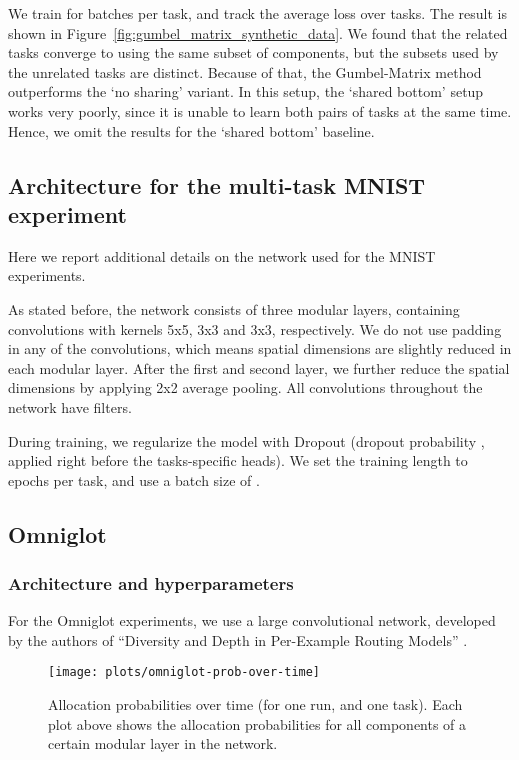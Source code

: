 \documentclass[conference]{IEEEtran}
\begin{document}
We train for  batches per task, and track the average loss over tasks. The result is shown in Figure~\ref{fig:gumbel_matrix_synthetic_data}. We found that the related tasks converge to using the same subset of components, but the subsets used by the unrelated tasks are distinct. Because of that, the Gumbel-Matrix method outperforms the `no sharing' variant. In this setup, the `shared bottom' setup works very poorly, since it is unable to learn both pairs of tasks at the same time. Hence, we omit the results for the `shared bottom' baseline.

\subsection{Architecture for the multi-task MNIST experiment}\label{appendix:mnist_mt_network}

Here we report additional details on the network used for the MNIST experiments. 

As stated before, the network consists of three modular layers, containing convolutions with kernels 5x5, 3x3 and 3x3, respectively. We do not use padding in any of the convolutions, which means spatial dimensions are slightly reduced in each modular layer. After the first and second layer, we further reduce the spatial dimensions by applying 2x2 average pooling. All convolutions throughout the network have  filters.

During training, we regularize the model with Dropout (dropout probability , applied right before the tasks-specific heads). We set the training length to  epochs per task, and use a batch size of .

\subsection{Omniglot}

\subsubsection{Architecture and hyperparameters}\label{appendix:omniglot_mt_network}

For the Omniglot experiments, we use a large convolutional network, developed by the authors of “Diversity and Depth in Per-Example Routing Models” \cite{Diversity&Depth-ICLR-2019}.

\begin{figure*}[t]
\begin{center}
\texttt{[image: plots/omniglot-prob-over-time]}
\end{center}
\caption{Allocation probabilities over time (for one run, and one task). Each plot above shows the allocation probabilities for all components of a certain modular layer in the network.}\label{fig:omniglot_probs_over_time}
\end{figure*}
\end{document}
